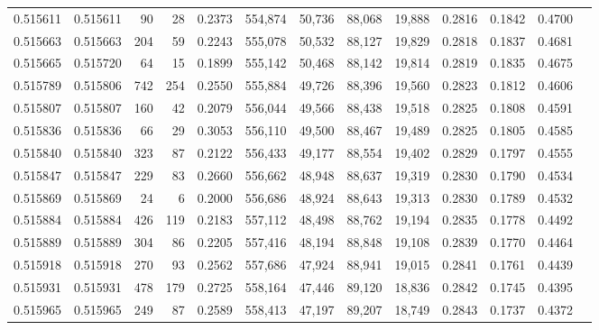 \begin{tabular}{rrrrrrrrrrrrr}
0.515611 & 0.515611 &    90 &    28 &                                     0.2373 & 554,874 &  50,736 &  88,068 &  19,888 & 0.2816 & 0.1842 & 0.4700 \\
0.515663 & 0.515663 &   204 &    59 &                                     0.2243 & 555,078 &  50,532 &  88,127 &  19,829 & 0.2818 & 0.1837 & 0.4681 \\
0.515665 & 0.515720 &    64 &    15 &                                     0.1899 & 555,142 &  50,468 &  88,142 &  19,814 & 0.2819 & 0.1835 & 0.4675 \\
0.515789 & 0.515806 &   742 &   254 &                                     0.2550 & 555,884 &  49,726 &  88,396 &  19,560 & 0.2823 & 0.1812 & 0.4606 \\
0.515807 & 0.515807 &   160 &    42 &                                     0.2079 & 556,044 &  49,566 &  88,438 &  19,518 & 0.2825 & 0.1808 & 0.4591 \\
0.515836 & 0.515836 &    66 &    29 &                                     0.3053 & 556,110 &  49,500 &  88,467 &  19,489 & 0.2825 & 0.1805 & 0.4585 \\
0.515840 & 0.515840 &   323 &    87 &                                     0.2122 & 556,433 &  49,177 &  88,554 &  19,402 & 0.2829 & 0.1797 & 0.4555 \\
0.515847 & 0.515847 &   229 &    83 &                                     0.2660 & 556,662 &  48,948 &  88,637 &  19,319 & 0.2830 & 0.1790 & 0.4534 \\
0.515869 & 0.515869 &    24 &     6 &                                     0.2000 & 556,686 &  48,924 &  88,643 &  19,313 & 0.2830 & 0.1789 & 0.4532 \\
0.515884 & 0.515884 &   426 &   119 &                                     0.2183 & 557,112 &  48,498 &  88,762 &  19,194 & 0.2835 & 0.1778 & 0.4492 \\
0.515889 & 0.515889 &   304 &    86 &                                     0.2205 & 557,416 &  48,194 &  88,848 &  19,108 & 0.2839 & 0.1770 & 0.4464 \\
0.515918 & 0.515918 &   270 &    93 &                                     0.2562 & 557,686 &  47,924 &  88,941 &  19,015 & 0.2841 & 0.1761 & 0.4439 \\
0.515931 & 0.515931 &   478 &   179 &                                     0.2725 & 558,164 &  47,446 &  89,120 &  18,836 & 0.2842 & 0.1745 & 0.4395 \\
0.515965 & 0.515965 &   249 &    87 &                                     0.2589 & 558,413 &  47,197 &  89,207 &  18,749 & 0.2843 & 0.1737 & 0.4372 \\

\end{tabular}
